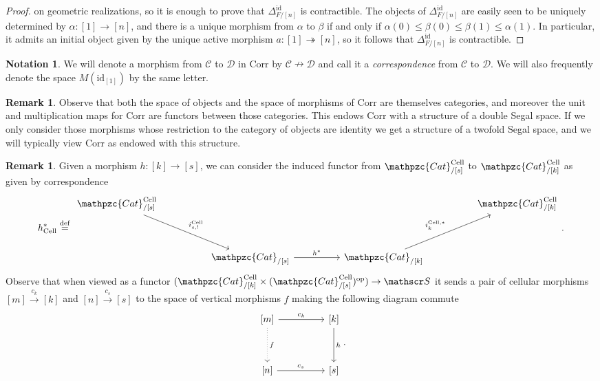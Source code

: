 \documentclass[a4paper, reqno]{amsart}
\theoremstyle{definition}
\newtheorem{remark}[theorem]{Remark}
\newtheorem{notation}[theorem]{Notation}
\newcommand\cC{\mathscr C}
\newcommand\cD{\mathscr D}
\newcommand\cS{\mathscr S}
\newcommand\id{\mathrm{id}}
\newcommand\op{\mathrm{op}}
\newcommand\ccat{\mathpzc{Cat}}
\newcommand\bydef{\overset{\mathrm{def}}{=}}
\newcommand\cell{\mathrm{Cell}}
\begin{document}
\begin{proof}
on geometric realizations, so it is enough to prove that $\Delta_{F/[n]}^\id$ is contractible. The objects of $\Delta_{F/[n]}^\id$ are easily seen to be uniquely determined by $\alpha:[1]\rightarrow[n]$, and there is a unique morphism from $\alpha$ to $\beta$ if and only if $\alpha(0)\leq\beta(0)\leq\beta(1)\leq\alpha(1)$. In particular, it admits an initial object given by the unique active morphism $a:[1]\twoheadrightarrow[n]$, so it follows that $\Delta_{F/[n]}^\id$ is contractible.
\end{proof}
\begin{notation}
We will denote a morphism from $\cC$ to $\cD$ in $\mathrm{Corr}$ by $\cC\nrightarrow \cD$ and call it a \textit{correspondence} from $\cC$ to $\cD$. We will also frequently denote the space $M(\id_{[1]})$ by the same letter.
\end{notation}
\begin{remark}\label{rem:bicat}
Observe that both the space of objects and the space of morphisms of $\mathrm{Corr}$ are themselves categories, and moreover the unit and multiplication maps for $\mathrm{Corr}$ are functors between those categories. This endows $\mathrm{Corr}$ with a structure of a double Segal space. If we only consider those morphisms whose restriction to the category of objects are identity we get a structure of a twofold Segal space, and we will typically view $\mathrm{Corr}$ as endowed with this structure.
\end{remark}
\begin{remark}\label{rem:corr_corr}
Given a morphism $h:[k]\rightarrow[s]$, we can consider the induced functor from $\ccat^\cell_{/[s]}$ to $\ccat^\cell_{/[k]}$ as given by correspondence
\[
h^*_\cell\bydef\begin{tikzcd}[row sep=huge, column sep=huge]
\ccat^\cell_{/[s]}\arrow[dr, "i^\cell_{s,!}"]&{}&{}&\ccat^\cell_{/[k]}\\
{}&\ccat_{/[s]}\arrow[r, "h^*"]&\ccat_{/[k]}\arrow[ur, "i_k^{\cell,*}"]
\end{tikzcd}.
\]
Observe that when viewed as a functor $(\ccat^\cell_{/[k]}\times(\ccat^\cell_{/[s]})^\op)\rightarrow\cS$ it sends a pair of cellular morphisms $[m]\xrightarrow{c_k}[k]$ and $[n]\xrightarrow{c_s}[s]$ to the space of vertical morphisms $f$ making the following diagram commute
\[
\begin{tikzcd}[row sep=huge, column sep=huge]
{[m]}\arrow[d, dotted, "f"]\arrow[r, "c_k"]&{[k]}\arrow[d, "h"]\\
{[n]}\arrow[r, "c_s"]&{[s]}
\end{tikzcd}.
\]
\end{remark}
\end{document}
